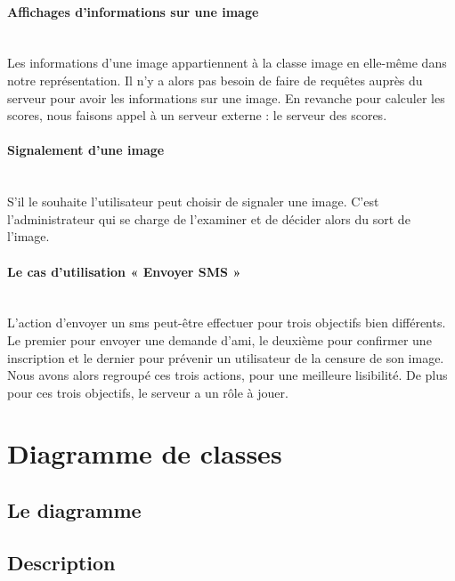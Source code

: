 \documentclass[11pt,a4paper]{article}
\begin{document}
\paragraph{\textcolor{myDarkBlue}{Affichages d'informations sur une image}}~\\
Les informations d’une image appartiennent à la classe
image en elle-même dans notre représentation. Il n’y a
alors pas besoin de faire de requêtes auprès du serveur
pour avoir les informations sur une image. En revanche
pour calculer les scores, nous faisons appel à un serveur
externe : le serveur des scores.


\paragraph{\textcolor{myDarkRed}{Signalement d'une image}}~\\
S’il le souhaite l’utilisateur peut choisir de signaler
une image. C’est l’administrateur qui se charge de
l’examiner et de décider alors du sort de l’image.

\paragraph{Le cas d'utilisation « Envoyer SMS »}~\\
L’action d’envoyer un sms peut-être effectuer pour trois objectifs bien différents. Le premier pour envoyer une demande d’ami, le deuxième pour confirmer une inscription et le dernier pour prévenir un utilisateur de la censure de son image. Nous avons alors regroupé ces trois actions, pour une meilleure lisibilité. De plus pour ces trois objectifs, le serveur a un rôle à jouer.

\newpage


\section{Diagramme de classes}

\subsection{Le diagramme}
\subsection{Description}

\newpage
\end{document}
